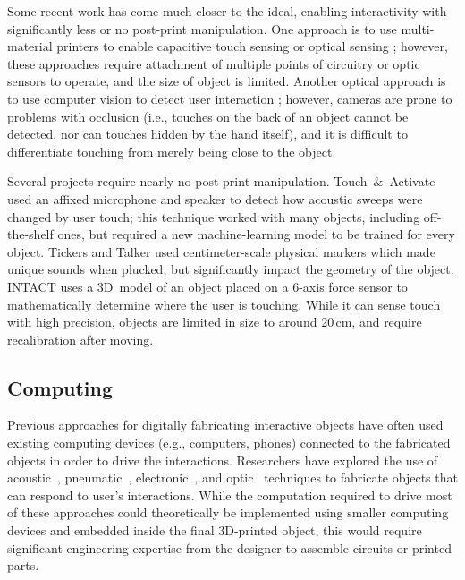       Some recent work has come much closer to the \pap ideal, enabling
      interactivity with significantly less or no post-print manipulation. One
      approach is to use multi-material printers to enable capacitive touch
      sensing \cite{Schmitz:2015, Schmitz:2019, Gotzelmann:2016} or optical
      sensing \cite{Willis:2012}; however, these approaches require attachment
      of multiple points of circuitry or optic sensors to operate, and the size
      of object is limited. Another optical approach is to use computer vision
      to detect user interaction \cite{Shi:2016a}; however, cameras are prone to
      problems with occlusion (i.e., touches on the back of an object cannot be
      detected, nor can touches hidden by the hand itself), and it is difficult
      to differentiate touching from merely being close to the object.

      Several projects require nearly no post-print manipulation.
      Touch~\&~Activate \cite{Ono:2013} used an affixed microphone and speaker
      to detect how acoustic sweeps were changed by user touch; this technique
      worked with many objects, including off-the-shelf ones, but required a new
      machine-learning model to be trained for every object.  Tickers and Talker
      \cite{Shi:2016} used centimeter-scale physical markers which made unique
      sounds when plucked, but significantly impact the geometry of the object.
      INTACT \cite{Hudin:2016} uses a 3D~model of an object placed on a 6-axis
      force sensor to mathematically determine where the user is touching. While
      it can sense touch with high precision, objects are limited in size to
      around 20\,cm, and require recalibration after moving.

    \subsection{Computing} \label{sec:computing}
      Previous approaches for digitally fabricating interactive objects
      have often used existing computing devices (e.g., computers,
      phones) connected to the fabricated objects in order to drive the
      interactions. Researchers have explored the use of
      acoustic~\cite{Savage:2015, Tejada:2018, Shi:2016},
      pneumatic~\cite{Tejada:2020, Vazquez:2015, Ou:2016},
      electronic~\cite{Schmitz:2019, Savage:2014,Schmitz:2015}, and
      optic~\cite{Willis:2012, Savage:2013} techniques to fabricate
      objects that can respond to user's interactions. While the
      computation required to drive most of these approaches could
      theoretically be implemented using smaller computing devices and
      embedded inside the final 3D-printed object, this would require
      significant engineering expertise from the designer to assemble
      circuits or printed parts.


